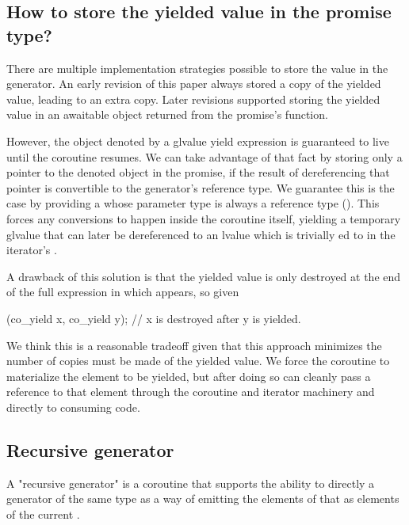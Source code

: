 \documentclass{wg21}
\begin{document}
\subsection{How to store the yielded value in the promise type?}

There are multiple implementation strategies possible to store the value in the generator.
An early revision of this paper always stored a copy of the yielded value, leading to an extra copy.
Later revisions supported storing the yielded value in an awaitable object
returned from the promise's  function.

However, the object denoted by a glvalue yield expression is guaranteed
to live until the coroutine resumes.
We can take advantage of that fact by
storing only a pointer to the denoted object in the promise,
if the result of dereferencing that pointer is convertible to the generator's
reference type. We guarantee this is the case by providing a 
whose parameter type is always a reference type
().
This forces any conversions to happen inside the coroutine itself,
yielding a temporary glvalue that can later be dereferenced
to an lvalue which is trivially ed to 
in the iterator's .

A drawback of this solution is that the yielded value is only destroyed at the end of the
full expression in which  appears, so given
\begin{colorblock}
    (co_yield x, co_yield y); // x is destroyed after y is yielded.
\end{colorblock}
We think this is a reasonable tradeoff given that this approach minimizes the
number of copies must be made of the yielded value.
We force the coroutine to materialize the element to be yielded,
but after doing so can cleanly pass a reference to that element through
the coroutine and iterator machinery and directly to consuming code.


\subsection{Recursive generator}

A "recursive generator" is a coroutine that supports the ability to directly 
a generator of the same type as a way of emitting the elements of that 
as elements of the current .
\end{document}
